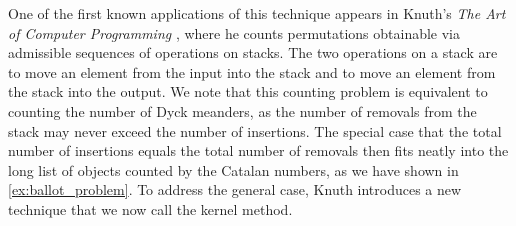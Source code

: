 \begin{example}
  One of the first known applications of this technique appears in Knuth's \textit{The Art of Computer Programming} \cite[Answer to Exercise 2.2.1.4, pp.~536--537]{Knuth}, 
  where he counts permutations obtainable via admissible sequences of operations on stacks. The two operations on a stack are to move an element from the input into the stack and to move an element from the stack into the output. We note that this counting problem is equivalent to counting the number of Dyck meanders, as the number of removals from the stack may never exceed the number of insertions. 
  The special case that the total number of insertions equals the total number of removals then fits neatly into the long list of objects counted by the Catalan numbers, as we have shown in \ref{ex:ballot_problem}.
  To address the general case, Knuth introduces a new technique that we now call the kernel method.


\end{example}
